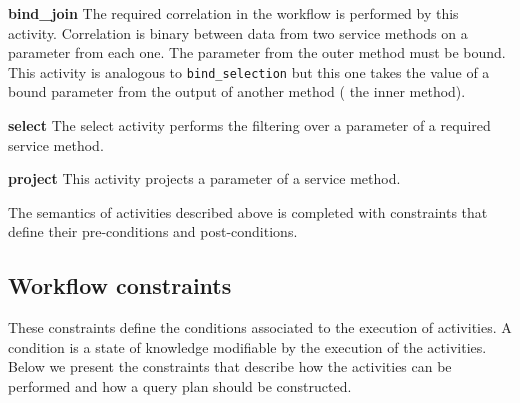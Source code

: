 %



\textbf{bind_join} The required correlation in the workflow is performed by this activity. Correlation is binary between data from two service methods on a parameter from each one. The parameter from the outer method must be bound. This activity is analogous to \texttt{bind_selection} but this one takes the value of a bound parameter from the output of another method (\ie{} the inner method).
                     
%


                     
\textbf{select} The select activity performs the filtering over a parameter of a required service method.
            
%


                     
\textbf{project} This activity projects a parameter of a service method.
                     
%


				   
The semantics of activities described above is completed with constraints that define their pre-conditions and post-conditions.
				
\subsection{Workflow constraints} These constraints define the conditions associated to the execution of activities. A condition is a state of knowledge modifiable by the execution of the activities. Below we present the constraints that describe how the activities can be performed and how a query plan should be constructed.
               
